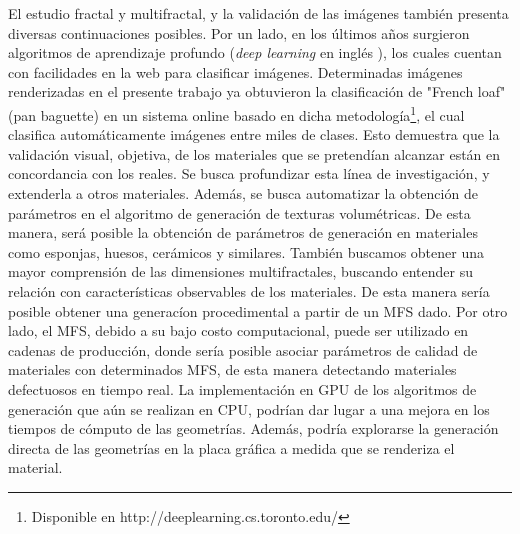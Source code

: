 El estudio fractal y multifractal, y la validación de las imágenes también presenta diversas continuaciones posibles.
Por un lado, en los últimos años surgieron algoritmos de aprendizaje profundo ({\em deep learning} en inglés \cite{Kiros2014}), los cuales cuentan con facilidades en la web para clasificar imágenes.
Determinadas imágenes renderizadas en el presente trabajo ya obtuvieron la clasificación de "French loaf" (pan baguette) en un sistema online basado en dicha metodología\footnote{Disponible en http://deeplearning.cs.toronto.edu/}, el cual clasifica automáticamente imágenes entre miles de clases.
Esto demuestra que la validación visual, objetiva, de los materiales que se pretendían alcanzar están en concordancia con los reales.
Se busca profundizar esta línea de investigación, y extenderla a otros materiales.
Además, se busca automatizar la obtención de parámetros en el algoritmo de generación de texturas volumétricas.
De esta manera, será posible la obtención de parámetros de generación en materiales como esponjas, huesos, cerámicos y similares.
También buscamos obtener una mayor comprensión de las dimensiones multifractales, buscando entender su relación con características observables de los materiales.
De esta manera sería posible obtener una generacíon procedimental a partir de un MFS dado.
Por otro lado, el MFS, debido a su bajo costo computacional, puede ser utilizado en cadenas de producción, donde sería posible asociar parámetros de calidad de materiales con determinados MFS, de esta manera detectando materiales defectuosos en tiempo real.
La implementación en GPU de los algoritmos de generación que aún se realizan en CPU, podrían dar lugar a una mejora en los tiempos de cómputo de las geometrías.
Además, podría explorarse la generación directa de las geometrías en la placa gráfica a medida que se renderiza el material.

